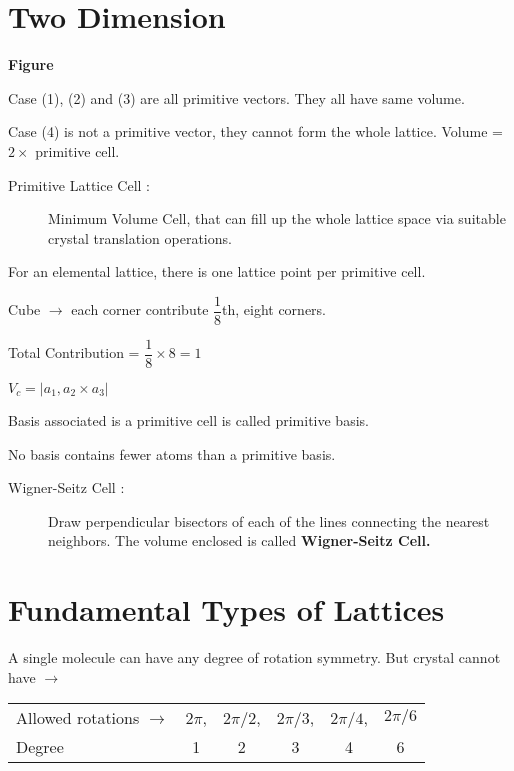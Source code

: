 \section*{Two Dimension}

\begin{center}
{\bf Figure}
\end{center}

Case (1), (2) and (3) are all primitive vectors. They all have same volume.

Case (4) is not a primitive vector, they cannot form the whole lattice. Volume = $2\times{}$ primitive cell.
\begin{description}
\item[Primitive Lattice Cell :] Minimum Volume Cell, that can fill up the whole lattice space via suitable crystal translation operations.
\end{description}

For an elemental lattice, there is one lattice point per primitive cell.

Cube $\to$ each corner contribute $\dfrac{1}{8}$th, eight corners.

Total Contribution = $\dfrac{1}{8}\times 8=1$

$V_{c}=|a_{1},a_{2}\times a_{3}|$

Basis associated is a primitive cell is called primitive basis.

No basis contains fewer atoms than a primitive basis.
\begin{description}
\item[Wigner-Seitz Cell :] Draw perpendicular bisectors of each of the lines connecting the nearest neighbors. The volume enclosed is called {\bf Wigner-Seitz Cell.}
\end{description}

\section*{Fundamental Types of Lattices}

A single molecule can have any degree of rotation symmetry. But crystal cannot have $\to$
\begin{center}
\begin{tabular}{lccccc}
Allowed rotations $\to$ & $2\pi$, & $2\pi/2$, & $2\pi/3$, & $2\pi/4$, & $2\pi/6$\\[3pt]
Degree & 1 & 2 & 3 & 4 & 6
\end{tabular}
\end{center}

